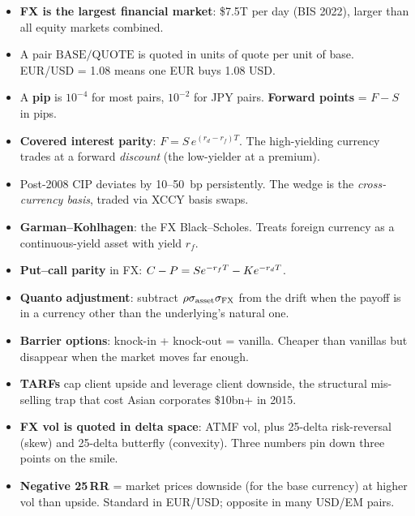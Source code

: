 \begin{itemize}
  \item \textbf{FX is the largest financial market}: \$7.5T per
    day (BIS 2022), larger than all equity markets combined.
  \item A pair $\mathrm{BASE}/\mathrm{QUOTE}$ is quoted in units of
    quote per unit of base.  EUR/USD = 1.08 means one EUR buys
    1.08 USD.
  \item A \textbf{pip} is $10^{-4}$ for most pairs, $10^{-2}$ for
    JPY pairs.  \textbf{Forward points} = $F - S$ in pips.
  \item \textbf{Covered interest parity}:
    $F = S\,e^{(r_d - r_f)T}$.  The high-yielding currency trades
    at a forward \emph{discount} (the low-yielder at a premium).
  \item Post-2008 CIP deviates by 10--50~bp persistently.  The
    wedge is the \emph{cross-currency basis}, traded via XCCY
    basis swaps.
  \item \textbf{Garman--Kohlhagen}: the FX Black--Scholes.  Treats
    foreign currency as a continuous-yield asset with yield $r_f$.
  \item \textbf{Put--call parity} in FX:
    $C - P = S e^{-r_f T} - K e^{-r_d T}$.
  \item \textbf{Quanto adjustment}: subtract
    $\rho \sigma_{\mathrm{asset}} \sigma_{\mathrm{FX}}$ from the
    drift when the payoff is in a currency other than the
    underlying's natural one.
  \item \textbf{Barrier options}: knock-in + knock-out = vanilla.
    Cheaper than vanillas but disappear when the market moves far
    enough.
  \item \textbf{TARFs} cap client upside and leverage client
    downside, the structural mis-selling trap that cost Asian
    corporates \$10bn+ in 2015.
  \item \textbf{FX vol is quoted in delta space}: ATMF vol, plus
    25-delta risk-reversal (skew) and 25-delta butterfly
    (convexity).  Three numbers pin down three points on the smile.
  \item \textbf{Negative 25\,RR} = market prices downside (for the
    base currency) at higher vol than upside.  Standard in
    EUR/USD; opposite in many USD/EM pairs.
\end{itemize}
